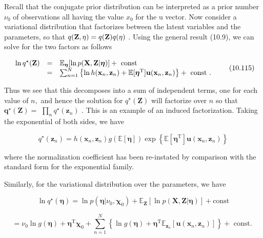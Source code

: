 \documentclass[
  10
]{article}
\begin{document}
Recall that the conjugate prior distribution can be interpreted as a
prior number \(\nu _ { 0 }\) of observations all having the value
\(x _ { 0 }\) for the u vector. Now consider a variational distribution
that factorizes between the latent variables and the parameters, so that
\(q ( { \bf Z } , \eta ) = q ( { \bf Z } ) q ( \eta )\) . Using the
general result (10.9), we can solve for the two factors as follows

\[
\begin{array}{r c l} \ln q ^ {\star} (\mathbf {Z}) & = & \mathbb {E} _ {\boldsymbol {\eta}} [ \ln p (\mathbf {X}, \mathbf {Z} | \boldsymbol {\eta}) ] + \text { const } \\ & = & \sum_ {n = 1} ^ {N} \left\{\ln h (\mathbf {x} _ {n}, \mathbf {z} _ {n}) + \mathbb {E} [ \boldsymbol {\eta} ^ {\mathrm{T}} ] \mathbf {u} (\mathbf {x} _ {n}, \mathbf {z} _ {n}) \right\} + \text { const }. \end{array}\tag{10.115}
\]

Thus we see that this decomposes into a sum of independent terms, one
for each value of \(n ,\) and hence the solution for
\(q ^ { \star } ( \mathbf { Z } )\) will factorize over \(n\) so that
\({ \boldsymbol { q } } ^ { \star } ( \mathbf { Z } ) =\)
\(\prod _ { n } q ^ { \star } ( \mathbf { z } _ { n } )\) . This is an
example of an induced factorization. Taking the exponential of both
sides, we have

\[
q ^ {\star} (\mathbf {z} _ {n}) = h (\mathbf {x} _ {n}, \mathbf {z} _ {n}) g \left(\mathbb {E} [ \boldsymbol {\eta} ]\right) \exp \left\{\mathbb {E} [ \boldsymbol {\eta} ^ {\mathrm{T}} ] \mathbf {u} (\mathbf {x} _ {n}, \mathbf {z} _ {n}) \right\}\tag{10.116}
\]

where the normalization coefficient has been re-instated by comparison
with the standard form for the exponential family.

Similarly, for the variational distribution over the parameters, we have

\[
\ln q ^ {\star} (\pmb {\eta}) = \ln p (\pmb {\eta} | \nu_ {0}, \pmb {\chi} _ {0}) + \mathbb {E} _ {\mathbf {Z}} [ \ln p (\mathbf {X}, \mathbf {Z} | \pmb {\eta}) ] + \mathrm{const}\tag{10.117}
\]

\[
= \nu_ {0} \ln g (\boldsymbol {\eta}) + \boldsymbol {\eta} ^ {\mathrm{T}} \boldsymbol {\chi} _ {0} + \sum_ {n = 1} ^ {N} \left\{\ln g (\boldsymbol {\eta}) + \boldsymbol {\eta} ^ {\mathrm{T}} \mathbb {E} _ {\mathbf {z} _ {n}} [ \mathbf {u} (\mathbf {x} _ {n}, \mathbf {z} _ {n}) ] \right\} + \text { const. }\tag{10.118}
\]
\end{document}
